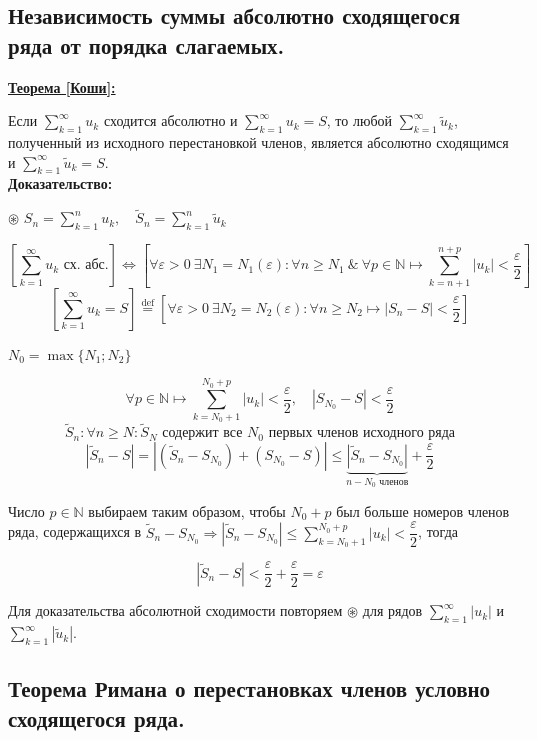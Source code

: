 \documentclass[a4paper,12pt]{article} %
\newcommand{\eqdef}{\stackrel{\mathrm{def}}{=}}
\newcommand{\N}{\mathbb{N}}
\newcommand{\useries}{\sum\limits_{k=1}^{\infty} u_k}
\newcommand{\auseries}{\sum\limits_{k=1}^{\infty} |u_k|}
\newcommand{\sn}{\sum\limits_{k=1}^{n} u_k}
\begin{document}
\subsection{Независимость суммы абсолютно сходящегося ряда от порядка слагаемых.}

\underline{\textbf{Теорема [Коши]:}}

Если $\useries$ сходится абсолютно и $\useries = S$, то любой $\sum\limits_{k=1}^{\infty} \tilde{u}_k$, полученный из исходного перестановкой членов, является абсолютно сходящимся и $\sum\limits_{k=1}^{\infty} \tilde{u}_k = S$.\\

\textbf{Доказательство:}

$\circledast$ $S_n = \sn, \hspace{1em} \tilde{S}_n = \sum\limits_{k=1}^{n} \tilde{u}_k$
	
\[\left[ \useries \text{ сх. абс.} \right] \Leftrightarrow \left[ \forall \varepsilon > 0 \ \exists N_1 = N_1(\varepsilon): \forall n \geqslant N_1 \ \& \ \forall p \in \N \mapsto \sum\limits_{k = n+1}^{n+p}|u_k| < \dfrac{\varepsilon}{2} \right] \]
\[ \left[ \useries = S \right] \eqdef \left[ \forall \varepsilon > 0 \ \exists N_2 = N_2(\varepsilon): \forall n \geqslant N_2 \mapsto \left| S_n - S \right| < \dfrac{\varepsilon}{2} \right] \]

$N_0 = \max \{ N_1; N_2 \}$

\[ \forall p \in \N \mapsto \sum\limits_{k = N_0 + 1}^{N_0 + p} |u_k| < \dfrac{\varepsilon}{2}, \hspace{1em} \left| S_{N_0} - S \right| < \dfrac{\varepsilon}{2} \]
\[\tilde{S}_n: \forall n \geqslant N: \tilde{S}_N \text{ содержит все } N_0 \text{ первых членов исходного ряда} \]
\[ |\tilde{S}_n - S| = |(\tilde{S}_n - S_{N_0}) + (S_{N_0} - S)| \leqslant \underbrace{|\tilde{S}_n - S_{N_0}|}_{n - N_0 \text{ членов}} + \dfrac{\varepsilon}{2} \]

Число $p \in \N$ выбираем таким образом, чтобы $N_0 + p$ был больше номеров членов ряда, содержащихся в $\tilde{S}_n - S_{N_0} \Rightarrow |\tilde{S}_n - S_{N_0}| \leqslant \sum\limits_{k=N_0 + 1}^{N_0 + p} |u_k| < \dfrac{\varepsilon}{2}$, тогда

\[ |\tilde{S}_n - S| < \dfrac{\varepsilon}{2} + \dfrac{\varepsilon}{2} = \varepsilon\]

Для доказательства абсолютной сходимости повторяем $\circledast$ для рядов $\auseries$ и $\sum\limits_{k=1}^{\infty}|\tilde{u}_k|$.

\subsection{Теорема Римана о перестановках членов условно сходящегося ряда.}
\end{document}
